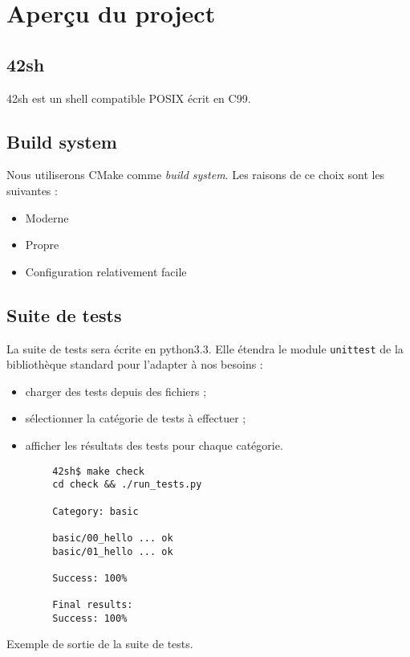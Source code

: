 \section{Aperçu du project}

\subsection{42sh}

42sh est un shell compatible POSIX écrit en C99.

\subsection{Build system}

Nous utiliserons CMake comme \emph{build system}. Les raisons de ce choix
sont les suivantes :
\begin{itemize}
    \item Moderne
    \item Propre
    \item Configuration relativement facile
\end{itemize}

\subsection{Suite de tests}

La suite de tests sera écrite en python3.3. Elle étendra le module
\texttt{unittest} de la bibliothèque standard pour l'adapter à nos besoins :

\begin{itemize}
    \item charger des tests depuis des fichiers ;
    \item sélectionner la catégorie de tests à effectuer ;
    \item afficher les résultats des tests pour chaque catégorie.
\end{itemize}

\begin{listing}[H]
    \begin{verbatim}
        42sh$ make check
        cd check && ./run_tests.py

        Category: basic

        basic/00_hello ... ok
        basic/01_hello ... ok

        Success: 100%

        Final results:
        Success: 100%
    \end{verbatim}
    \caption{Exemple de sortie de la suite de tests.}
\end{listing}

